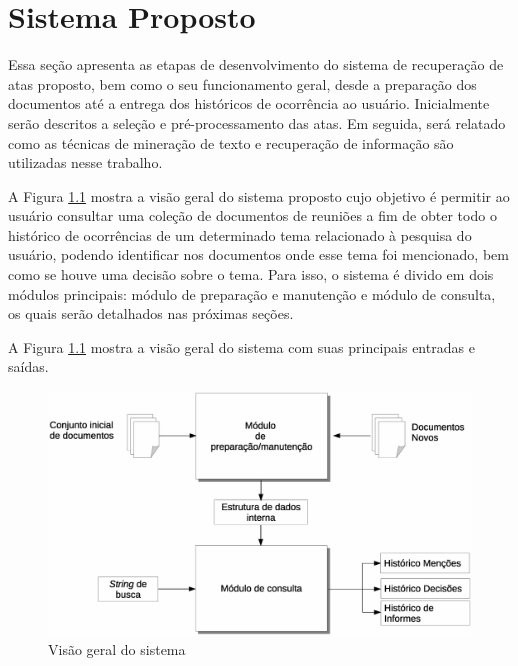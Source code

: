 \chapter{Sistema Proposto}\label{cap3}


Essa seção apresenta as etapas de desenvolvimento do sistema de recuperação de atas proposto, bem como o seu funcionamento geral, desde a preparação dos documentos até a entrega dos históricos de ocorrência ao usuário. Inicialmente serão descritos a seleção e pré-processamento das atas. Em seguida, será relatado como as técnicas de mineração de texto e recuperação de informação são utilizadas nesse trabalho.

A Figura \ref{fig:visao-geral} mostra a visão geral do sistema proposto cujo objetivo é permitir ao usuário consultar uma coleção de documentos de reuniões a fim de obter todo o histórico de ocorrências de um determinado tema relacionado à pesquisa do usuário, podendo identificar nos documentos onde esse tema foi mencionado, bem como se houve uma decisão sobre o tema. Para isso, o sistema é divido em dois módulos principais: módulo de preparação e manutenção e módulo de consulta, os quais serão detalhados nas próximas seções.  %

A Figura \ref{fig:visao-geral} mostra a visão geral do sistema com suas principais entradas e saídas. 


  \begin{figure}[!h]
	  \centering
	  \includegraphics[width=0.69\paperwidth]{conteudo/capitulos/figs/visao-geral-3.eps}
	  \caption{Visão geral do sistema}
	  \label{fig:visao-geral}
  \end{figure}






